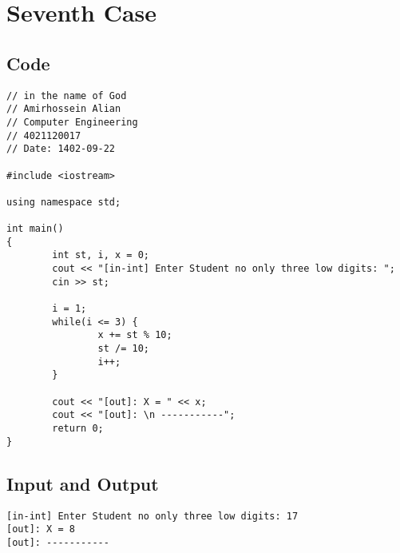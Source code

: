 \documentclass[12pt]{article}
\begin{document}
\pagebreak

  \section{Seventh Case}
        \subsection{Code}
   \begin{tcolorbox}[breakable, size=fbox, boxrule=1pt, pad at break*=1mm, colback=cellbackground, colframe=cellborder]
\begin{verbatim}
// in the name of God
// Amirhossein Alian
// Computer Engineering
// 4021120017
// Date: 1402-09-22

#include <iostream>

using namespace std;

int main()
{
        int st, i, x = 0;
        cout << "[in-int] Enter Student no only three low digits: ";
        cin >> st;

        i = 1;
        while(i <= 3) {
                x += st % 10;
                st /= 10;
                i++;
        }

        cout << "[out]: X = " << x;
        cout << "[out]: \n -----------";
        return 0;
}
\end{verbatim}
\end{tcolorbox}

	\subsection{Input and Output}

    \begin{tcolorbox}[breakable, size=fbox, boxrule=1pt, pad at break*=1mm, colback=cellbackground!5!white, colframe=gray!75!black, title=Test Case 1]
\begin{Verbatim}[commandchars=\\\{\}]
[in-int] Enter Student no only three low digits: 17
[out]: X = 8
[out]: -----------
\end{Verbatim}
\end{tcolorbox}

    
\end{document}

